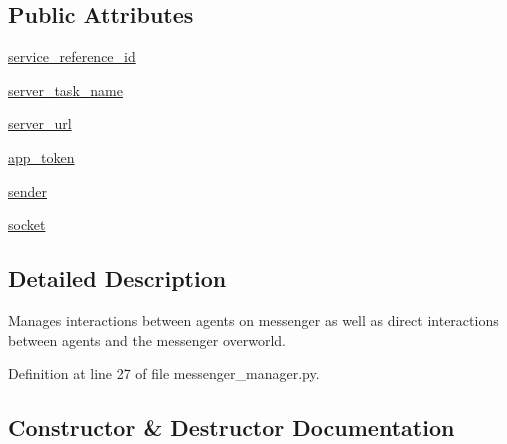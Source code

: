 \subsection*{Public Attributes}
\begin{DoxyCompactItemize}
\item 
\hyperlink{classparlai_1_1chat__service_1_1services_1_1messenger_1_1messenger__manager_1_1MessengerManager_a5e0b062728492fb6409eabe25895c5f8}{service\+\_\+reference\+\_\+id}
\item 
\hyperlink{classparlai_1_1chat__service_1_1services_1_1messenger_1_1messenger__manager_1_1MessengerManager_a7cef66a59364fa94ea8ff77a311ecf63}{server\+\_\+task\+\_\+name}
\item 
\hyperlink{classparlai_1_1chat__service_1_1services_1_1messenger_1_1messenger__manager_1_1MessengerManager_a70e95421663ad81807980f3461d4b380}{server\+\_\+url}
\item 
\hyperlink{classparlai_1_1chat__service_1_1services_1_1messenger_1_1messenger__manager_1_1MessengerManager_aa52ef2280a697896f4d3b5bdb322e553}{app\+\_\+token}
\item 
\hyperlink{classparlai_1_1chat__service_1_1services_1_1messenger_1_1messenger__manager_1_1MessengerManager_a1e14e377b1e59ddba4a23ea45f793b01}{sender}
\item 
\hyperlink{classparlai_1_1chat__service_1_1services_1_1messenger_1_1messenger__manager_1_1MessengerManager_a884b4e6cefa84652bbdb677f575ae6c4}{socket}
\end{DoxyCompactItemize}


\subsection{Detailed Description}
\begin{DoxyVerb}Manages interactions between agents on messenger as well as direct interactions
between agents and the messenger overworld.
\end{DoxyVerb}
 

Definition at line 27 of file messenger\+\_\+manager.\+py.



\subsection{Constructor \& Destructor Documentation}
\mbox{\label{classparlai_1_1chat__service_1_1services_1_1messenger_1_1messenger__manager_1_1MessengerManager_a7a9b4068fc428aebd90c38bbe745e45e}} 
